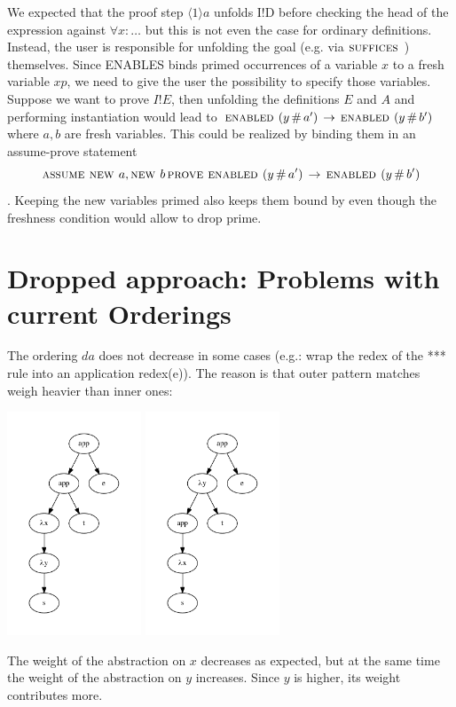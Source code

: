 \documentclass[a4paper]{article}
\newcommand{\tla}[1]{#1}
\newcommand{\impl}[0]{\,\rightarrow\,}
\newcommand{\proofstep}[2]{\langle{#1}\rangle{#2}}
\begin{document}
\begin{itemize}
We expected that the proof step $\tla{\proofstep{1}{a}}$ unfolds \tla{I!D}
 before checking the head of the expression against $\forall x : \ldots$ but
 this is not even the case for ordinary definitions. Instead, the user is
 responsible for unfolding the goal (e.g. via \tla{$\mbox{\sc suffices }$}) themselves.
 Since ENABLES binds primed occurrences of a variable $x$ to a fresh variable
 $xp$, we need to give the user the possibility to specify those variables.
 Suppose we want to prove $\tla{I!E}$, then unfolding the definitions $E$ and
 $A$ and performing instantiation would lead to
 $\tla{\ENABLED (y \dif a') \impl \ENABLED(y \dif b')}$ where $a,b$ are fresh
 variables. This could be realized by binding them in an assume-prove statement
 $$\tla{\ASSUME \NEW a, \NEW b \PROVE \ENABLED (y \dif a') \impl
   \ENABLED(y \dif b')}$$. Keeping the new variables primed also keeps them
 bound by \ENABLED even though the freshness condition would allow to drop
 prime.


\end{itemize}


\section{Dropped approach: Problems with current Orderings}
The ordering $da$ does not decrease in some cases (e.g.: wrap the redex of
  the *** rule into an application redex(e)). The reason is that outer pattern
  matches weigh heavier than inner ones:
  \begin{center}
    \includegraphics[width=4cm]{measure_ce1.pdf}
    \includegraphics[width=4cm]{measure_ce2.pdf}
  \end{center}

The weight of the abstraction on $x$ decreases as expected, but at the same time
the weight of the abstraction on $y$ increases. Since $y$ is higher, its weight
contributes more.
\end{document}
